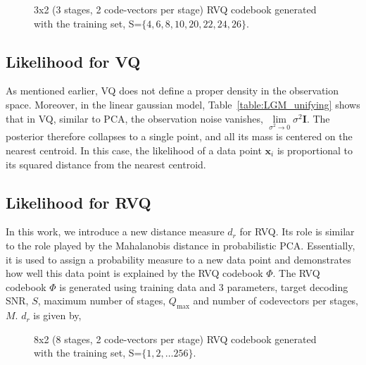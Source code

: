 								\begin{figure}[t]
								\centering
								\caption{3x2 (3 stages, 2 code-vectors per stage) RVQ codebook generated with the training set, S=$\{4, 6, 8, 10, 20, 22, 24, 26\}$. }
								\label{fig:RVQ_toy_3x2}
								\end{figure}



\subsection{Likelihood for VQ}
As mentioned earlier, VQ does not define a proper density in the observation space.  Moreover, in the linear gaussian model, Table~\ref{table:LGM_unifying} shows that in VQ, similar to PCA, the observation noise vanishes, $\lim\limits_{\sigma^2 \rightarrow 0} \sigma^2\mathbf{I}$.  The posterior therefore collapses to a single point, and all its mass is centered on the nearest centroid.  In this case, the likelihood of a data point $\mathbf{x}_i$ is proportional to its squared distance from the nearest centroid.

\subsection{Likelihood for RVQ}
In this work, we introduce a new distance measure $d_r$ for RVQ.  Its role is similar to the role played by the Mahalanobis distance in probabilistic PCA.  Essentially, it is used to assign a probability measure to a new data point and demonstrates how well this data point is explained by the RVQ codebook $\Phi$.  The RVQ codebook $\Phi$ is generated using training data and 3 parameters, target decoding SNR, $S$, maximum number of stages, $Q_{\textrm{max}}$ and number of codevectors per stages, $M$.  $d_r$ is given by,

								\begin{figure}[t]
								\centering
								\caption{8x2 (8 stages, 2 code-vectors per stage) RVQ codebook generated with the training set, S=$\{1, 2, \ldots 256\}$.}
								\label{fig:RVQ_toy_8x2}
								\end{figure}

